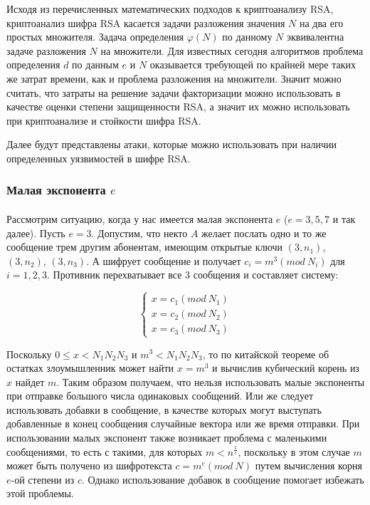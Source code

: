   Исходя из перечисленных математических подходов к криптоанализу RSA, криптоанализ шифра RSA касается задачи разложения значения $N$ на два его простых множителя. 
  Задача определения $\varphi(N)$ по данному $N$ эквивалентна задаче разложения $N$ на множители. Для известных сегодня алгоритмов
  проблема определения $d$ по данным $e$ и $N$ оказывается требующей по крайней мере таких же затрат времени, как и проблема разложения на 
  множители. Значит можно считать, что затраты на решение задачи факторизации можно использовать в качестве оценки степени защищенности RSA, а значит их можно использовать 
  при криптоанализе и стойкости шифра RSA.

  Далее будут представлены атаки, которые можно использовать при наличии определенных уязвимостей в шифре RSA. 

\subsubsection{Малая экспонента $e$}

  \paragraph{} Рассмотрим ситуацию, когда у нас имеется малая экспонента $e$ ($e = 3,5,7$ и так далее). Пусть $e=3$. Допустим, что некто
  $A$ желает послать одно и то же сообщение трем другим абонентам, имеющим открытые ключи $(3, n_1)$, $(3, n_2)$, $(3, n_3)$. А шифрует 
  сообщение и получает $c_i = m^3(mod \: N_i)$ для $i = 1, 2, 3$. Противник перехватывает все 3 сообщения и составляет систему:
  
    \begin{equation}
    	\begin{cases}
    	   x = c_1(mod \: N_1) \\
    	   x = c_2(mod \: N_2) \\
    	   x = c_3(mod \: N_3)
    	\end{cases}    
    \end{equation}

  Поскольку $0 \le x < N_1 N_2 N_3$ и $m^3 < N_1 N_2 N_3$, то по китайской теореме об остатках злоумышленник может найти 
  $x = m^3$ и вычислив кубический корень из $x$ найдет $m$. Таким образом получаем, что нельзя использовать малые экспоненты 
  при отправке большого числа одинаковых сообщений. Или же следует использовать добавки в сообщение, в качестве которых могут выступать добавленные в 
  конец сообщения случайные вектора или же время отправки. При использовании малых экспонент также возникает проблема с маленькими сообщениями, то есть 
  с такими, для которых $m < n^{\frac{1}{e}}$, поскольку в этом случае $m$ может быть получено из шифротекста 
  $c = m^e(mod \: N)$ путем вычисления корня $e$-ой степени из $c$. Однако использование добавок в сообщение помогает избежать этой 
  проблемы.

